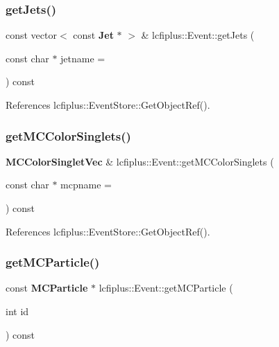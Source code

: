 \subsubsection{get\+Jets()}
{\footnotesize\ttfamily const vector$<$ const \textbf{ Jet} $\ast$ $>$ \& lcfiplus\+::\+Event\+::get\+Jets (\begin{DoxyParamCaption}\item[{const char $\ast$}]{jetname = {} }\end{DoxyParamCaption}) const}



References lcfiplus\+::\+Event\+Store\+::\+Get\+Object\+Ref().

\mbox{\label{classlcfiplus_1_1Event_a84eb9b9cb1fd347e6d2569d93ee342a3}} 
\subsubsection{get\+M\+C\+Color\+Singlets()}
{\footnotesize\ttfamily \textbf{ M\+C\+Color\+Singlet\+Vec} \& lcfiplus\+::\+Event\+::get\+M\+C\+Color\+Singlets (\begin{DoxyParamCaption}\item[{const char $\ast$}]{mcpname = {} }\end{DoxyParamCaption}) const}



References lcfiplus\+::\+Event\+Store\+::\+Get\+Object\+Ref().

\mbox{\label{classlcfiplus_1_1Event_a424b7d450747ff99b5a79f648502f4b5}} 
\subsubsection{get\+M\+C\+Particle()\hspace{0.1cm}{\footnotesize\ttfamily [1/2]}}
{\footnotesize\ttfamily const \textbf{ M\+C\+Particle} $\ast$ lcfiplus\+::\+Event\+::get\+M\+C\+Particle (\begin{DoxyParamCaption}\item[{int}]{id }\end{DoxyParamCaption}) const}



